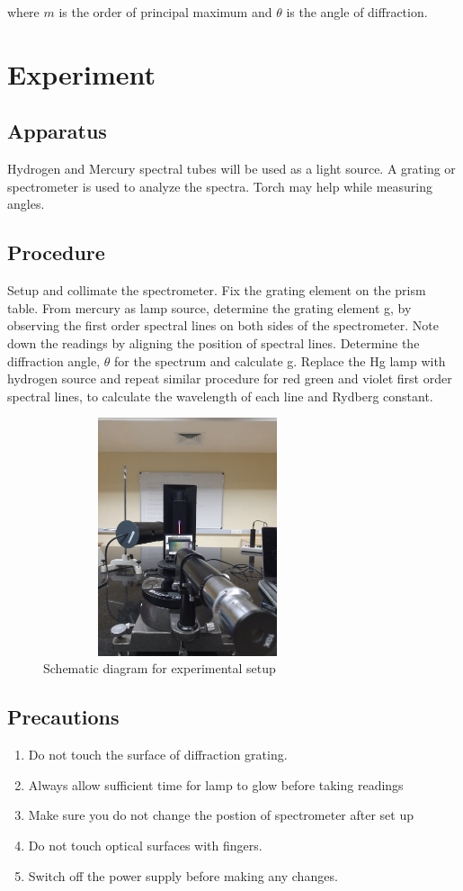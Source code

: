 \documentclass[a4paper, amsfonts, amssymb, amsmath, reprint, showkeys, nofootinbib, twoside]{revtex4-1}
\begin{document}
where $m$ is the order of principal maximum and $\theta$ is the angle of diffraction.



\section{Experiment}
\subsection{Apparatus}
Hydrogen and Mercury spectral tubes will be used as a light source. A grating or spectrometer is used to analyze the spectra. Torch may help while measuring angles. 
\subsection{Procedure}
Setup and collimate the spectrometer. Fix the grating element on the prism table. From mercury as lamp source, determine the grating element g, by observing the first order spectral lines on both sides of the spectrometer. Note down the readings by aligning the position of spectral lines. Determine the diffraction angle, $\theta$ for the spectrum and calculate g. Replace the Hg lamp with hydrogen source and repeat similar procedure for red green and violet first order spectral lines, to calculate the wavelength of each line and Rydberg constant. 

\begin{figure}[H] %
	\centering
	\includegraphics[width=8.5cm,height=7cm,angle=270]{1} 
	\caption{Schematic diagram for experimental setup}
	\label{1}
\end{figure}

\subsection{Precautions}
\begin{enumerate}
	\item {Do not touch the surface of diffraction grating.}
	\item {Always allow sufficient time for lamp to glow before taking readings}
	\item {Make sure you do not change the postion of spectrometer after set up}
	\item {Do not touch optical surfaces with fingers.}
	\item {Switch off the power supply before making any changes.}
\end{enumerate}
\end{document}
